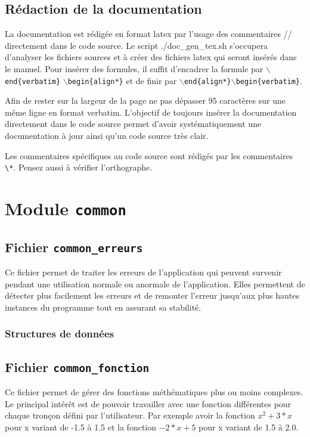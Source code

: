 \documentclass{article}
\begin{document}
\subsection{Rédaction de la documentation}
La documentation est rédigée en format latex par l'usage des commentaires // directement dans le code source. Le script ./doc\_gen\_tex.sh s'occupera d'analyser les fichiers sources et à créer des fichiers latex qui seront insérés dans le manuel.
Pour insérer des formules, il suffit d'encadrer la formule par $\backslash$\texttt{end\{verbatim\}} $\backslash$\texttt{begin\{align*\}} et de finir par $\backslash$\texttt{end\{align*\}}$\backslash$\texttt{begin\{verbatim\}}.\par
Afin de rester sur la largeur de la page ne pas dépasser 95 caractères sur une même ligne en format verbatim. L'objectif de toujours insérer la documentation directement dans le code source permet d'avoir systématiquement une documentation à jour ainsi qu'un code source très clair.\par
Les commentaires spécifiques au code source sont rédigés par les commentaires \verb+\*+. Pensez aussi à vérifier l'orthographe.\par
\section{Module {\texttt{common}}}
\subsection{Fichier {\texttt{common\_erreurs}}}
Ce fichier permet de traiter les erreurs de l'application qui peuvent survenir pendant une utilisation normale ou anormale de l'application. Elles permettent de détecter plus facilement les erreurs et de remonter l'erreur jusqu'aux plus hautes instances du programme tout en assurant sa stabilité.
\subsubsection{Structures de données}
\subsection{Fichier {\texttt{common\_fonction}}}
Ce fichier permet de gérer des fonctions méthématiques plus ou moins complexes. Le principal intérêt est de pouvoir travailler avec une fonction différentes pour chaque tronçon défini par l'utilisateur. Par exemple avoir la fonction $x^2+3*x$ pour x variant de -1.5 à 1.5 et la fonction $-2*x+5$ pour x variant de 1.5 à 2.0.
\end{document}
